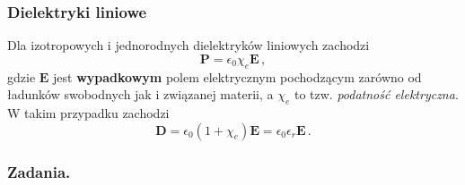 \documentclass[../main.tex]{subfiles}
\begin{document}
\subsubsection*{Dielektryki liniowe}
Dla izotropowych i jednorodnych dielektryków liniowych zachodzi
\begin{equation*}
    \mathbf{P}=\epsilon_0\chi_e\mathbf{E}\,,
\end{equation*}
gdzie \(\mathbf{E}\) jest \textbf{wypadkowym} polem elektrycznym pochodzącym zarówno od ładunków
swobodnych jak i związanej materii, a \(\chi_e\) to tzw. \textit{podatność elektryczna}. W takim
przypadku zachodzi
\begin{equation*}
    \mathbf{D}=\epsilon_0(1+\chi_e)\mathbf{E}=\epsilon_0\epsilon_r\mathbf{E}\,.
\end{equation*}
\subsubsection*{Zadania.}
\end{document}

